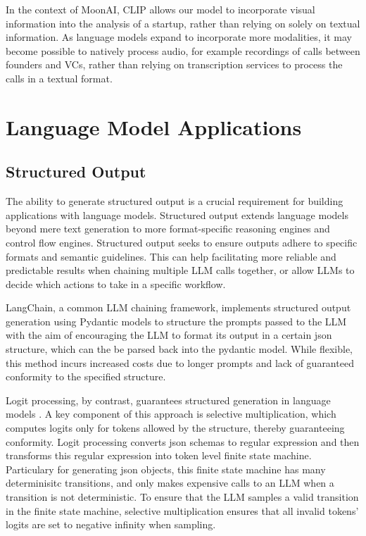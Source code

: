 \documentclass[a4paper, oneside]{discothesis}
\begin{document}
In the context of MoonAI, CLIP allows our model to incorporate visual information into the analysis of a startup, rather than relying on solely on textual information. As language models expand to incorporate more modalities, it may become possible to natively process audio, for example recordings of calls between founders and VCs, rather than relying on transcription services to process the calls in a textual format. 

\section{Language Model Applications}

\subsection{Structured Output}
The ability to generate structured output is a crucial requirement for building applications with language models. Structured output extends language models beyond mere text generation to more format-specific reasoning engines and control flow engines. Structured output seeks to ensure outputs adhere to specific formats and semantic guidelines. This can help facilitating more reliable and predictable results when chaining multiple LLM calls together,  or allow LLMs to decide which actions to take in a specific workflow.

LangChain, a common LLM chaining framework, implements structured output generation using Pydantic models to structure the prompts passed to the LLM with the aim of encouraging the LLM to format its output in a certain json structure, which can the be parsed back into the pydantic model. While flexible, this method incurs increased costs due to longer prompts and lack of guaranteed conformity to the specified structure.

Logit processing, by contrast, guarantees structured generation in language models \cite{chaudhari2023logit}. A key component of this approach is selective multiplication, which computes logits only for tokens allowed by the structure, thereby guaranteeing conformity. Logit processing converts json schemas to regular expression and then transforms this regular expression into token level finite state machine. Particulary for generating json objects, this finite state machine has many determinisitc transitions, and only makes expensive calls to an LLM when a transition is not deterministic. To ensure that the LLM samples a valid transition in the finite state machine, selective multiplication ensures that all invalid tokens' logits are set to negative infinity when sampling.
\end{document}
